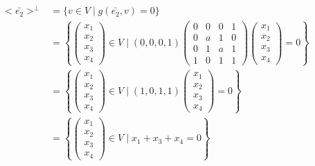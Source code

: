 \begin{ejercicio}
\begin{enumerate}
\begin{itemize}
            \begin{equation*}\begin{split}
                <\bar{e_2}>^\perp &= \{v \in V \mid g(\bar{e_2},v) = 0\} 
                 \\
                &= \left\{ \left(\begin{array}{c}
                     x_1 \\ x_2 \\ x_3 \\ x_4
                \end{array} \right) \in V \mid (0, 0, 0, 1) \left(\begin{array}{cccc}
                    0 & 0 & 0 & 1 \\
                    0 & a & 1 & 0 \\
                    0 & 1 & a & 1 \\
                    1 & 0 & 1 & 1
                \end{array} \right) 
                \left(\begin{array}{c}
                     x_1 \\ x_2 \\ x_3 \\x_4
                \end{array} \right) = 0\right\} \\
                &= \left\{ \left(\begin{array}{c}
                     x_1 \\ x_2 \\ x_3 \\x_4
                \end{array} \right) \in V \mid (1, 0, 1, 1)
                \left(\begin{array}{c}
                     x_1 \\ x_2 \\ x_3 \\ x_4
                \end{array} \right) = 0\right\} \\
                &= \left\{ \left(\begin{array}{c}
                     x_1 \\ x_2 \\ x_3 \\ x_4
                \end{array} \right) \in V \mid x_1+x_3+x_4 = 0\right\}
            \end{split}\end{equation*}


\end{itemize}
\end{enumerate}
\end{ejercicio}
